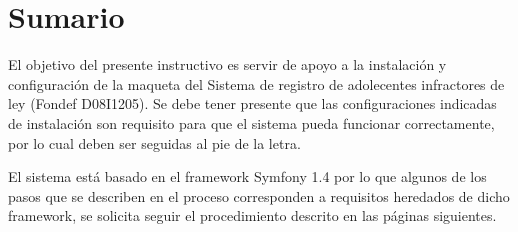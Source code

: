 \chapter*{Sumario}

El objetivo del presente instructivo es servir de apoyo a la instalaci\'on y configuraci\'on de la maqueta del Sistema de registro de adolecentes infractores de ley (Fondef D08I1205). Se debe tener presente que las configuraciones indicadas de instalaci\'on son requisito para que el sistema pueda funcionar correctamente, por lo cual deben ser seguidas al pie de la letra.\newline

El sistema est\'a basado en el framework Symfony 1.4 por lo que algunos de los pasos que se describen en el proceso corresponden a requisitos heredados de dicho framework, se solicita seguir el procedimiento descrito en las p\'aginas siguientes.\newline




